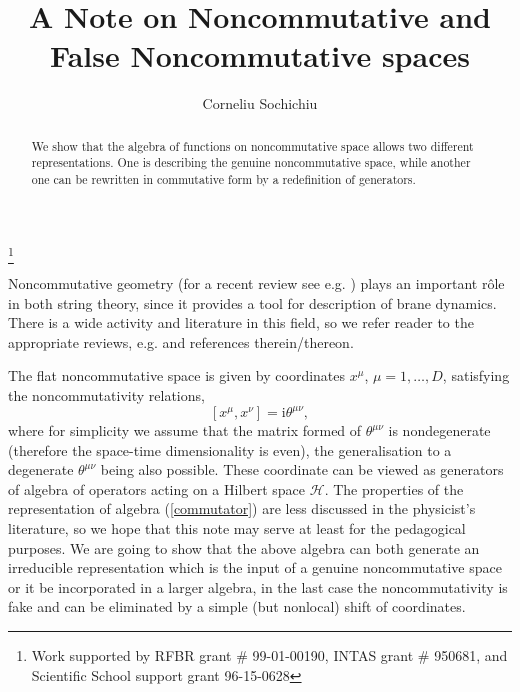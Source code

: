 \documentclass[a4paper]{amsart}
\newcommand{\ii}{\mathrm{i}}
\newcommand{\hh}{\mathcal{H}}
\begin{document}
\title[Noncommutative \& False Noncommutative]{A Note on Noncommutative and
 False Noncommutative spaces}%
\author{Corneliu Sochichiu}%
\address{Institutul de Fizic\u a Aplicat\u a
A\c S, str. Academiei, nr. 5, Chi\c sin\u au, MD2028
MOLDOVA}%
\address{Bogoliubov Laboratory of Theoretical Physics\\
Joint Institute for Nuclear Research\\ 141980 Dubna, Moscow Reg.\\
RUSSIA}
%

\thanks{Work supported by RFBR grant \#  99-01-00190, INTAS grant \# 950681,
and Scientific School support grant 96-15-0628}%

\begin{abstract}
We show that the algebra of functions on noncommutative space
allows two different representations. One is describing the
genuine noncommutative space, while another one can be rewritten
in commutative form by a redefinition of generators.
\end{abstract}
\maketitle

Noncommutative geometry (for a recent review see e.g.
\cite{Connes:2000by}) plays an important r\^{o}le in both string
theory, since it provides a tool for description of brane
dynamics. There is a wide activity and literature in this field,
so we refer reader to the appropriate reviews, e.g.
\cite{Seiberg:1999vs} and references therein/thereon.

The flat noncommutative space is given by coordinates $x^\mu$,
$\mu=1,\dots,D$, satisfying the noncommutativity relations,
\begin{equation}\label{commutator}
  [x^\mu,x^\nu]=\ii \theta^{\mu\nu},
\end{equation}
where for simplicity we assume that the matrix formed of
$\theta^{\mu\nu}$ is nondegenerate (therefore the space-time
dimensionality is even), the generalisation to a degenerate
$\theta^{\mu\nu}$ being also possible. These coordinate can be
viewed as generators of algebra of operators acting on a Hilbert
space $\hh$. The properties of the representation of algebra
(\ref{commutator}) are less discussed in the physicist's
literature, so we hope that this note may serve at least for the
pedagogical purposes. We are going to show that the above algebra
can both generate an irreducible representation which is the input
of a genuine noncommutative space or it be incorporated in a
larger algebra, in the last case the noncommutativity is fake and
can be eliminated by a simple (but nonlocal) shift of coordinates.
\end{document}
